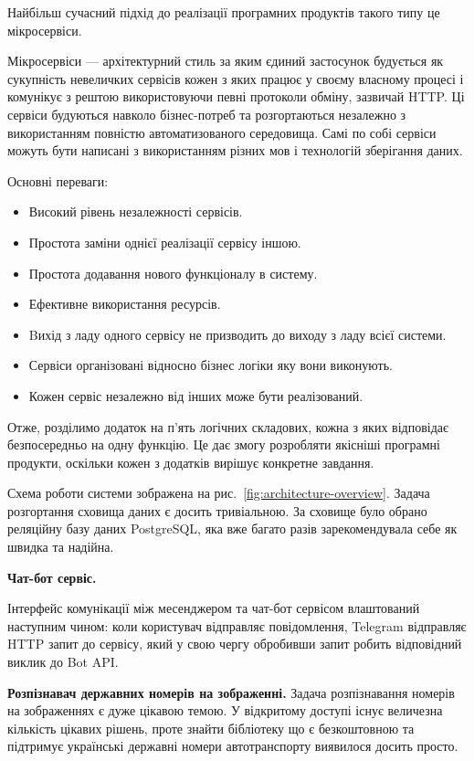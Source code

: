 Найбільш сучасний підхід до реалізації програмних продуктів такого типу це мікросервіси.

Мікросервіси — архітектурний стиль за яким єдиний застосунок будується
як сукупність невеличких сервісів кожен з яких працює у своєму власному
процесі і комунікує з рештою використовуючи певні протоколи обміну,
зазвичай HTTP. Ці сервіси будуються навколо бізнес-потреб та розгортаються
незалежно з використанням повністю автоматизованого середовища.
Самі по собі сервіси можуть бути написані з використанням різних мов і технологій
зберігання даних.

Основні переваги:

\begin{itemize}
  \item Високий рівень незалежності сервісів.
  \item Простота заміни однієї реалізації сервісу іншою.
  \item Простота додавання нового функціоналу в систему.
  \item Ефективне використання ресурсів.
  \item Bихід з ладу одного сервісу не призводить до виходу з ладу всієї системи.
  \item Сервіси організовані відносно бізнес логіки яку вони виконують.
  \item Кожен сервіс незалежно від інших може бути реалізований.
\end{itemize}

Отже, розділимо додаток на п'ять логічних складових,
кожна з яких відповідає безпосередньо на одну функцію.
Це дає змогу розробляти якісніші програмні продукти,
оскільки кожен з додатків вирішує конкретне завдання.

Схема роботи системи зображена на рис.~\ref{fig:architecture-overview}.
Задача розгортання сховища даних є досить тривіальною.
За сховище було обрано реляційну базу даних PostgreSQL,
яка вже багато разів зарекомендувала себе як швидка та надійна.

\textbf{Чат-бот сервіс.}

Інтерфейс комунікації між месенджером та чат-бот сервісом влаштований наступним чином:
коли користувач відправляє повідомлення, Telegram відправляє HTTP запит до сервісу,
який у свою чергу обробивши запит робить відповідний виклик до Bot API.

\textbf{Розпізнавач державних номерів на зображенні.}
Задача розпізнавання номерів на зображеннях є дуже цікавою темою.
У відкритому доступі існує величезна кількість цікавих рішень, проте
знайти бібліотеку що є безкоштовною та підтримує
українські державні номери автотранспорту виявилося досить просто.

